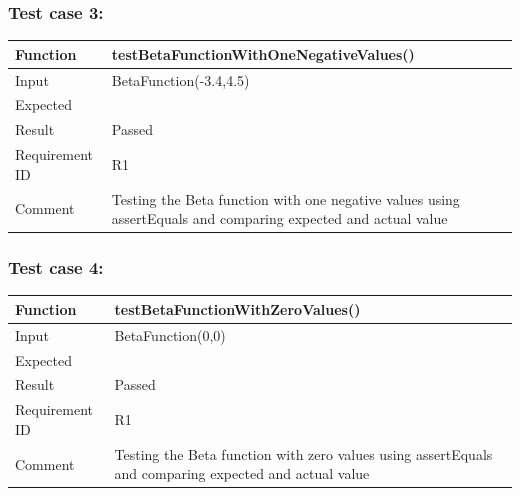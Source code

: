 \documentclass[letterpaper, 11pt]{article}
\begin{document}
        \subsubsection{\textbf{Test case 3:}}  
            \setlength{\tabcolsep}{25pt}
            \renewcommand{\arraystretch}{1.5}
            \begin{tabularx}{1.0\textwidth} { 
                  | >{\raggedright\arraybackslash}X 
                  | >{\raggedright\arraybackslash}X | }
                 \hline
                 Function & testBetaFunctionWithOneNegativeValues()\\
                 \hline
                 Input  & BetaFunction(-3.4,4.5)\\
                  \hline
                 Expected  & -1\\
                  \hline
                 Result  & Passed\\
                  \hline
                 Requirement ID  & R1\\
                    \hline
                 Comment  & Testing the Beta function with one negative values using assertEquals and comparing expected and actual value\\
                \hline
            \end{tabularx} 

        \subsubsection{\textbf{Test case 4:}}  
            \setlength{\tabcolsep}{25pt}
            \renewcommand{\arraystretch}{1.5}
            \begin{tabularx}{1.0\textwidth} { 
                  | >{\raggedright\arraybackslash}X 
                  | >{\raggedright\arraybackslash}X | }
                 \hline
                 Function & testBetaFunctionWithZeroValues()\\
                 \hline
                 Input  & BetaFunction(0,0)\\
                  \hline
                 Expected  & -1\\
                  \hline
                 Result  & Passed\\
                  \hline
                 Requirement ID  & R1\\
                    \hline
                 Comment  & Testing the Beta function with zero values using assertEquals and comparing expected and actual value\\
                \hline
            \end{tabularx} 
\end{document}
